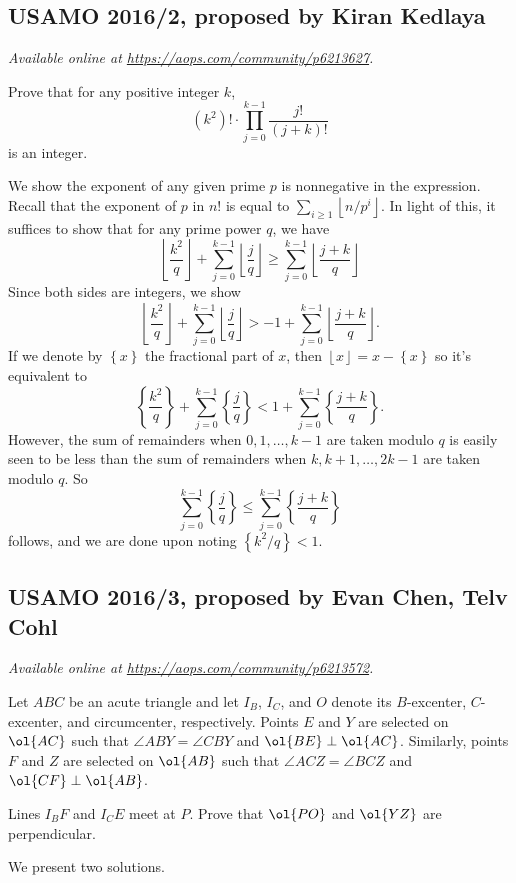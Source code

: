 \documentclass[11pt]{scrartcl}
\begin{document}
\subsection{USAMO 2016/2, proposed by Kiran Kedlaya}
\textsl{Available online at \url{https://aops.com/community/p6213627}.}
\begin{mdframed}[style=mdpurplebox,frametitle={Problem statement}]
Prove that for any positive integer $k$,
\[ (k^2)!\cdot\displaystyle\prod_{j=0}^{k-1}\frac{j!}{(j+k)!} \]
is an integer.
\end{mdframed}
We show the exponent of any given prime $p$ is nonnegative in the expression.
Recall that the exponent of $p$ in $n!$ is equal to
$\sum_{i \ge 1} \left\lfloor n/p^i \right\rfloor$.
In light of this, it suffices to show
that for any prime power $q$, we have
\[
\left\lfloor \frac{k^2}{q} \right\rfloor
+ \sum_{j=0}^{k-1} \left\lfloor \frac{j}{q} \right\rfloor
\ge \sum_{j=0}^{k-1} \left\lfloor \frac{j+k}{q} \right\rfloor
\]
Since both sides are integers, we show
\[
\left\lfloor \frac{k^2}{q} \right\rfloor
+ \sum_{j=0}^{k-1} \left\lfloor \frac{j}{q} \right\rfloor
> -1 + \sum_{j=0}^{k-1} \left\lfloor \frac{j+k}{q} \right\rfloor.
\]
If we denote by $\left\{ x \right\}$ the fractional part of $x$,
then $\left\lfloor x \right\rfloor = x - \left\{ x \right\}$
so it's equivalent to
\[
\left\{ \frac{k^2}{q} \right\}
+ \sum_{j=0}^{k-1} \left\{ \frac{j}{q} \right\}
< 1 + \sum_{j=0}^{k-1} \left\{ \frac{j+k}{q} \right\}.
\]
However, the sum of remainders when $0, 1, \dots, k-1$ are taken modulo $q$
is easily seen to be less than the sum of remainders
when $k, k+1, \dots, 2k-1$ are taken modulo $q$.
So \[ \sum_{j=0}^{k-1} \left\{ \frac{j}{q} \right\}
\le \sum_{j=0}^{k-1} \left\{ \frac{j+k}{q} \right\} \] follows,
and we are done upon noting $\left\{ k^2/q \right\} < 1$.
\pagebreak

\subsection{USAMO 2016/3, proposed by Evan Chen, Telv Cohl}
\textsl{Available online at \url{https://aops.com/community/p6213572}.}
\begin{mdframed}[style=mdpurplebox,frametitle={Problem statement}]
Let $ABC$ be an acute triangle
and let $I_B$, $I_C$, and $O$ denote its
$B$-excenter, $C$-excenter, and circumcenter, respectively.
Points $E$ and $Y$ are selected on $\ol{AC}$ such that
$\angle ABY = \angle CBY$ and $\ol{BE} \perp \ol{AC}$.
Similarly, points $F$ and $Z$ are selected on $\ol{AB}$ such that
$\angle ACZ = \angle BCZ$ and $\ol{CF} \perp \ol{AB}$.

Lines $I_B F$ and $I_C E$ meet at $P$.
Prove that $\ol{PO}$ and $\ol{YZ}$ are perpendicular.
\end{mdframed}
We present two solutions.
\end{document}
